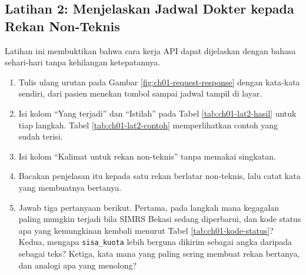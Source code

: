 \subsection*{Latihan 2: Menjelaskan Jadwal Dokter kepada Rekan Non-Teknis}

Latihan ini membuktikan bahwa cara kerja API dapat dijelaskan dengan bahasa
sehari-hari tanpa kehilangan ketepatannya.

\begin{enumerate}
  \item Tulis ulang urutan pada Gambar \ref{fig:ch01-request-response} dengan
        kata-kata sendiri, dari pasien menekan tombol sampai jadwal tampil di
        layar.
  \item Isi kolom ``Yang terjadi'' dan ``Istilah'' pada Tabel
        \ref{tab:ch01-lat2-hasil} untuk tiap langkah. Tabel
        \ref{tab:ch01-lat2-contoh} memperlihatkan contoh yang sudah terisi.
  \item Isi kolom ``Kalimat untuk rekan non-teknis'' tanpa memakai singkatan.
  \item Bacakan penjelasan itu kepada satu rekan berlatar non-teknis, lalu catat
        kata yang membuatnya bertanya.
  \item Jawab tiga pertanyaan berikut. Pertama, pada langkah mana kegagalan
        paling mungkin terjadi bila SIMRS Bekasi sedang diperbarui, dan kode
        status apa yang kemungkinan kembali menurut Tabel
        \ref{tab:ch01-kode-status}? Kedua, mengapa \texttt{sisa\_kuota} lebih
        berguna dikirim sebagai angka daripada sebagai teks? Ketiga, kata mana
        yang paling sering membuat rekan bertanya, dan analogi apa yang menolong?
\end{enumerate}

